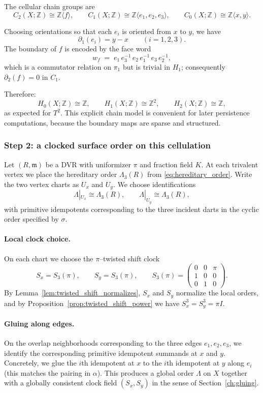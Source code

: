 \documentclass[11pt,oneside]{amsbook}
\numberwithin{equation}{section}
\theoremstyle{plain}
\theoremstyle{definition}
\theoremstyle{remark}
\newcommand{\Z}{\mathbb{Z}}
\begin{document}
The cellular chain groups are
\[
C_2(X;\Z)\cong \Z\langle f\rangle,\qquad C_1(X;\Z)\cong \Z\langle e_1,e_2,e_3\rangle,\qquad C_0(X;\Z)\cong \Z\langle x,y\rangle.
\]

Choosing orientations so that each $e_i$ is oriented from $x$ to $y$, we have
\[
\partial_1(e_i)=y-x\qquad (i=1,2,3).
\]
The boundary of $f$ is encoded by the face word
\[
w_f \;=\; e_1\,e_3^{-1}\,e_2\,e_1^{-1}\,e_3\,e_2^{-1},
\]
which is a commutator relation on $\pi_1$ but is trivial in $H_1$; consequently $\partial_2(f)=0$ in $C_1$.

Therefore:
\[
H_0(X;\Z)\cong \Z,\qquad H_1(X;\Z)\cong \Z^2,\qquad H_2(X;\Z)\cong \Z,
\]
as expected for $T^2$.
This explicit chain model is convenient for later persistence computations, because the boundary maps are sparse and structured.

\subsubsection{Step 2: a clocked surface order on this cellulation}

Let $(R,\mathfrak m)$ be a DVR with uniformizer $\pi$ and fraction field $K$.
At each trivalent vertex we place the hereditary order $\Lambda_3(R)$ from \eqref{eq:hereditary_order}.
Write the two vertex charts as $U_x$ and $U_y$.
We choose identifications
\[
\Lambda|_{U_x}\cong \Lambda_3(R),\qquad \Lambda|_{U_y}\cong \Lambda_3(R),
\]
with primitive idempotents corresponding to the three incident darts in the cyclic order specified by $\sigma$.

\paragraph{Local clock choice.}
On each chart we choose the $\pi$--twisted shift clock
\[
S_x=S_3(\pi),\qquad S_y=S_3(\pi),
\qquad 
S_3(\pi)=
\begin{pmatrix}
0&0&\pi\\
1&0&0\\
0&1&0
\end{pmatrix}.
\]
By Lemma~\ref{lem:twisted_shift_normalizes}, $S_x$ and $S_y$ normalize the local orders, and by Proposition~\ref{prop:twisted_shift_power} we have $S_x^3=S_y^3=\pi I$.

\paragraph{Gluing along edges.}
On the overlap neighborhoods corresponding to the three edges $e_1,e_2,e_3$, we identify the corresponding primitive idempotent summands at $x$ and $y$.
Concretely, we glue the $i$th idempotent at $x$ to the $i$th idempotent at $y$ along $e_i$ (this matches the pairing in $\alpha$).
This produces a global order $\Lambda$ on $X$ together with a globally consistent clock field $(S_x,S_y)$ in the sense of Section~\ref{ch:gluing}.
\end{document}
